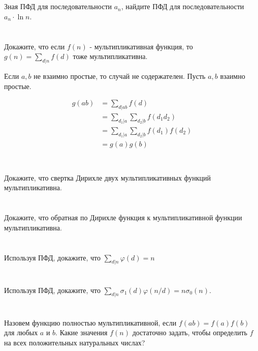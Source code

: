 \section{}
Зная ПФД для последовательности $a_n$, найдите ПФД для последовательности $a_n \cdot \ln n$.

\section{}
Докажите, что если $f(n)$  - мультипликативная функция, то $g(n) = \sum\limits_{d | n} f(d)$ тоже мультипликативна.

Если \(a, b\) не взаимно простые, то случай не содержателен. Пусть \(a, b\) взаимно простые.

\begin{align*}
    g(ab) & = \sum_{d | ab} f(d)                          \\
          & = \sum_{d_1 | a} \sum_{d_2 | b} f(d_1 d_2)    \\
          & = \sum_{d_1 | a} \sum_{d_2 | b} f(d_1) f(d_2) \\
          & = g(a)g(b) \\
\end{align*}

\section{}
Докажите, что свертка Дирихле двух мультипликативных функций мультипликативна.

\section{}
Докажите, что обратная по Дирихле функция к мультипликативной функции мультипликативна.

\section{}
Используя ПФД, докажите, что $\sum\limits_{d | n}\varphi(d) = n$

\section{}
Используя ПФД, докажите, что $\sum\limits_{d | n}\sigma_1(d)\varphi(n/d) = n \sigma_0(n)$.

\section{}
Назовем функцию полностью мультипликативной, если $f(ab) = f(a)f(b)$ для любых $a$ и $b$. Какие значения $f(n)$ достаточно задать, чтобы определить $f$ на всех положительных натуральных числах?

